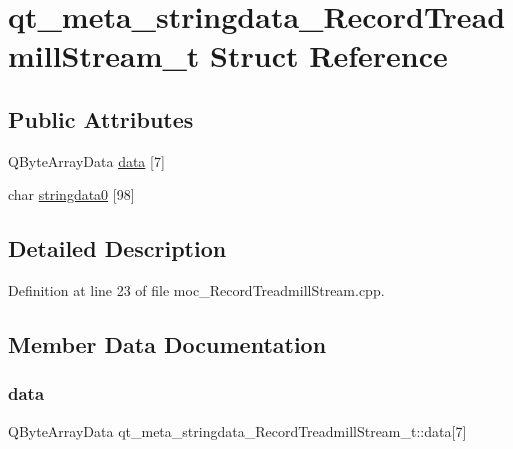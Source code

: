 \hypertarget{structqt__meta__stringdata___record_treadmill_stream__t}{}\section{qt\+\_\+meta\+\_\+stringdata\+\_\+\+Record\+Treadmill\+Stream\+\_\+t Struct Reference}
\label{structqt__meta__stringdata___record_treadmill_stream__t}
\subsection*{Public Attributes}
\begin{DoxyCompactItemize}
\item 
Q\+Byte\+Array\+Data \hyperlink{structqt__meta__stringdata___record_treadmill_stream__t_a79a526e366a6a8034edaa9b526cb4042}{data} \mbox{[}7\mbox{]}
\item 
char \hyperlink{structqt__meta__stringdata___record_treadmill_stream__t_a23cb5bbf2f1df8ccc64367e5a1bc2d25}{stringdata0} \mbox{[}98\mbox{]}
\end{DoxyCompactItemize}


\subsection{Detailed Description}


Definition at line 23 of file moc\+\_\+\+Record\+Treadmill\+Stream.\+cpp.



\subsection{Member Data Documentation}
\mbox{\label{structqt__meta__stringdata___record_treadmill_stream__t_a79a526e366a6a8034edaa9b526cb4042}} 
\subsubsection{\texorpdfstring{data}{data}}
{\footnotesize\ttfamily Q\+Byte\+Array\+Data qt\+\_\+meta\+\_\+stringdata\+\_\+\+Record\+Treadmill\+Stream\+\_\+t\+::data\mbox{[}7\mbox{]}}



